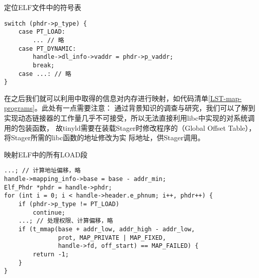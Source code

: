 \begin{listing}
\caption{定位ELF文件中的符号表}
\label{LST-find-load}
\begin{verbatim}
switch (phdr->p_type) {
    case PT_LOAD:
        ... // 略
    case PT_DYNAMIC:
        handle->dl_info->vaddr = phdr->p_vaddr;
        break;
    case ...: // 略
}
\end{verbatim}
\end{listing}

在之后我们就可以利用中取得的信息对内存进行映射，如代码清单\ref{LST-map-programs}。此处有一点需要注意：
通过背景知识的调查与研究，我们可以了解到实现动态链接器的工作量几乎不可接受，所以无法直接利用libc中实现的对系统调用的包装函数，
故tinyld需要在装载Stager时修改程序的（Global Offset Table），将Stager所需的libc函数的地址修改为实
际地址，供Stager调用。

\begin{listing}
\caption{映射ELF中的所有LOAD段}
\label{LST-map-programs}
\begin{verbatim}
...; // 计算地址偏移，略
handle->mapping_info->base = base - addr_min;
Elf_Phdr *phdr = handle->phdr;
for (int i = 0; i < handle->header.e_phnum; i++, phdr++) {
    if (phdr->p_type != PT_LOAD)
        continue;
    ...; // 处理权限、计算偏移，略
    if (t_mmap(base + addr_low, addr_high - addr_low,
               prot, MAP_PRIVATE | MAP_FIXED,
               handle->fd, off_start) == MAP_FAILED) {
        return -1;
    }
}
\end{verbatim}
\end{listing}
